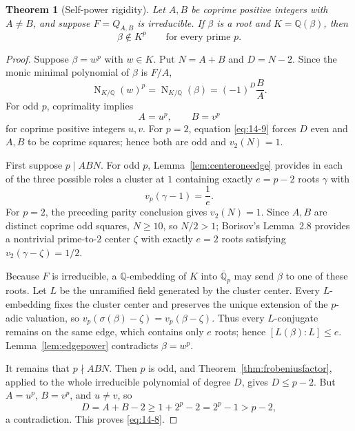 \documentclass[11pt]{article}
\numberwithin{equation}{section}
\newtheorem{theorem}{Theorem}[section]
\theoremstyle{definition}
\newcommand{\Q}{\mathbb Q}
\begin{document}
\begin{theorem}[Self-power rigidity]\label{thm:selfpower}
Let \(A,B\) be coprime positive integers with \(A\neq B\), and suppose
\(F=Q_{A,B}\) is irreducible.  If \(\beta\) is a root and
\(K=\Q(\beta)\), then
\begin{equation}
 \beta\notin K^p
 \qquad\text{for every prime }p.
 \label{eq:14-8}
\end{equation}
\end{theorem}

\begin{proof}
Suppose \(\beta=w^p\) with \(w\in K\).  Put \(N=A+B\) and
\(D=N-2\).  Since the monic minimal polynomial of \(\beta\) is \(F/A\),
\begin{equation}
 \operatorname N_{K/\Q}(w)^p
 =\operatorname N_{K/\Q}(\beta)
 =(-1)^D\frac BA.
 \label{eq:14-9}
\end{equation}
For odd \(p\), coprimality implies
\[
 A=u^p,\qquad B=v^p
\]
for coprime positive integers \(u,v\).  For \(p=2\), equation \eqref{eq:14-9}
forces \(D\) even and \(A,B\) to be coprime squares; hence both are odd and
\(v_2(N)=1\).

First suppose \(p\mid ABN\).  For odd \(p\),
Lemma~\ref{lem:centeroneedge} provides in each of the three possible roles a
cluster at \(1\) containing exactly \(e=p-2\) roots
\(\gamma\) with
\[
 v_p(\gamma-1)=\frac1e.
\]
For \(p=2\), the preceding parity conclusion gives \(v_2(N)=1\).  Since
\(A,B\) are distinct coprime odd squares, \(N\geq10\), so \(N/2>1\);
Borisov's Lemma~2.8 provides a nontrivial prime-to-\(2\) center \(\zeta\)
with exactly \(e=2\) roots satisfying
\(v_2(\gamma-\zeta)=1/2\).

Because \(F\) is irreducible, a \(\Q\)-embedding of \(K\) into
\(\overline{\Q}_p\) may send \(\beta\) to one of these roots.  Let \(L\)
be the unramified field generated by the cluster center.  Every \(L\)-embedding fixes the cluster center and preserves the unique
extension of the \(p\)-adic valuation, so
\(v_p(\sigma(\beta)-\zeta)=v_p(\beta-\zeta)\).  Thus every
\(L\)-conjugate remains on the same edge, which contains only \(e\) roots;
hence \([L(\beta):L]\leq e\).  Lemma~\ref{lem:edgepower} contradicts
\(\beta=w^p\).

It remains that \(p\nmid ABN\).  Then \(p\) is odd, and
Theorem~\ref{thm:frobeniusfactor}, applied to the whole irreducible polynomial
of degree \(D\), gives \(D\leq p-2\).  But \(A=u^p\), \(B=v^p\), and
\(u\neq v\), so
\[
 D=A+B-2\geq1+2^p-2=2^p-1>p-2,
\]
a contradiction.  This proves \eqref{eq:14-8}.
\end{proof}
\end{document}
